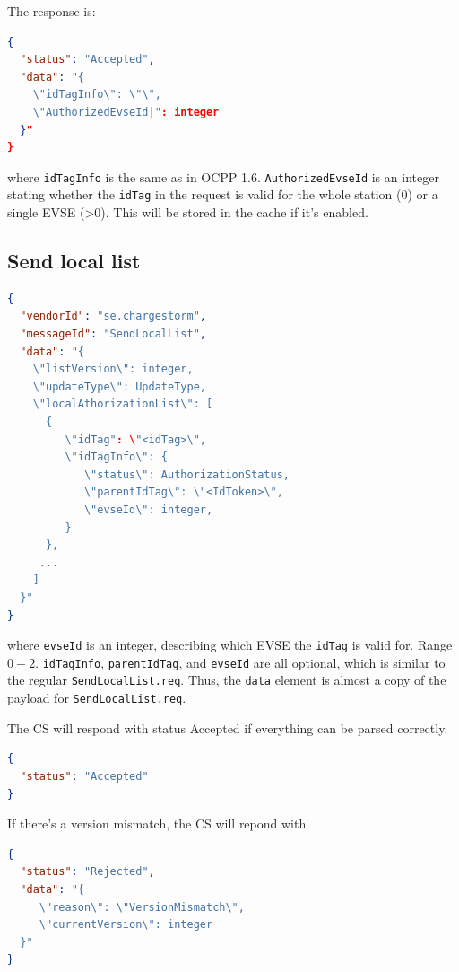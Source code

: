 \documentclass{scrartcl}
\begin{document}
The response is:
\begin{lstlisting}[language=json,caption={DataTransfer.conf for
ExtendedStopTransactionRequest sent to the CS},captionpos=t]
{
  "status": "Accepted",
  "data": "{
    \"idTagInfo\": \"\",
    \"AuthorizedEvseId|": integer
  }"
}
\end{lstlisting}
where \verb|idTagInfo| is the same as in OCPP 1.6.
\verb|AuthorizedEvseId| is an integer stating whether the \verb|idTag| in the
request is valid for the whole station (0) or a single EVSE (>0). This will be
stored in the cache if it's enabled.




\subsection{Send local list}
\label{sec:send-local-list}

\begin{lstlisting}[language=json,caption={DataTransfer.req for SendLocalList
sent to the CS},captionpos=t]
{
  "vendorId": "se.chargestorm",
  "messageId": "SendLocalList",
  "data": "{
    \"listVersion\": integer,
    \"updateType\": UpdateType,
    \"localAthorizationList\": [
      {
         \"idTag": \"<idTag>\",
         \"idTagInfo\": {
            \"status\": AuthorizationStatus,
            \"parentIdTag\": \"<IdToken>\",
            \"evseId\": integer,
         }
      },
     ...
    ]
  }"
}
\end{lstlisting}
where \verb|evseId| is an integer, describing which EVSE the \verb|idTag| is
valid for. Range $0-2$.
\verb|idTagInfo|, \verb|parentIdTag|, and \verb|evseId| are all optional,
which is similar to the regular \verb|SendLocalList.req|. Thus, the
\verb|data| element is almost a copy of the payload for
\verb|SendLocalList.req|. 

The CS will respond with status Accepted if everything can be parsed
correctly.
\begin{lstlisting}[language=json,caption={DataTransfer.conf for a successful
SendLocalList sent from the CS},captionpos=t]
{
  "status": "Accepted"
}
\end{lstlisting}

If there's a version mismatch, the CS will repond with
\begin{lstlisting}[language=json,caption={DataTransfer.conf for a failed
SendLocalList sent from the CS},captionpos=t]
{
  "status": "Rejected",
  "data": "{
     \"reason\": \"VersionMismatch\",
     \"currentVersion\": integer
  }"
}
\end{lstlisting}
\end{document}
